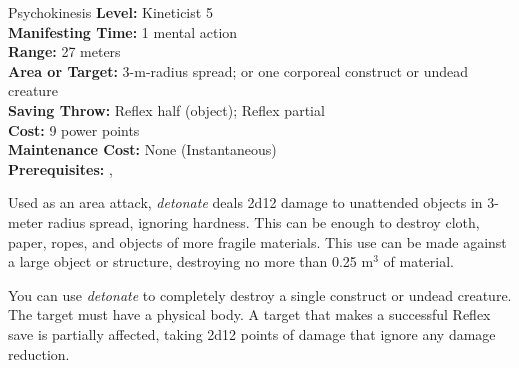 {Psychokinesis}
{
	\textbf{Level:}
	Kineticist 5\\
	\textbf{Manifesting Time:}
	1 mental action\\
	\textbf{Range:}
	27 meters\\
	\textbf{Area or Target:}
	3-m-radius spread; or one corporeal construct or undead creature\\
	\textbf{Saving Throw:}
	Reflex half (object); Reflex partial\\
	\textbf{Cost:}
	9 power points\\
	\textbf{Maintenance Cost:}
	None (Instantaneous)\\
	\textbf{Prerequisites:}
	, \\
}
{
	Used as an area attack, \emph{detonate} deals 2d12 damage to unattended objects in 3-meter radius spread, ignoring hardness. This can be enough to destroy cloth, paper, ropes, and objects of more fragile materials. This use can be made against a large object or structure, destroying no more than 0.25 m$^3$ of material.

	You can use \emph{detonate} to completely destroy a single construct or undead creature. The target must have a physical body. A target that makes a successful Reflex save is partially affected, taking 2d12 points of damage that ignore any damage reduction.
}